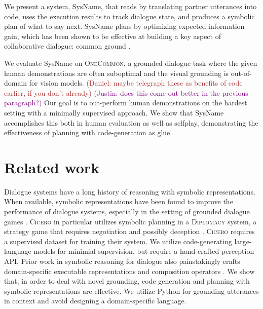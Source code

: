 \documentclass[11pt]{article}
\newcommand{\system}{SysName}
\newcommand{\justin}[1]{{{\textcolor{purple}{(Justin: #1)}}}}
\newcommand{\daniel}[1]{{{\textcolor{brown}{(Daniel: #1)}}}}
\begin{document}
We present a system, \system{}, 
that reads by translating partner utterances into code,
uses the execution results to track dialogue state, and produces a symbolic plan of what to say next.
\system{} plans by optimizing expected information gain, which has been shown to be effective at building 
a key aspect of collaborative dialogue: common ground \citep{yu2019info,white-etal-2021-open,ocp}.

We evaluate \system{} on \textsc{OneCommon},
a grounded dialogue task where the given human demonstrations are often suboptimal and the visual grounding
is out-of-domain for vision models.
\daniel{maybe telegraph these as benefits of code earlier, if you don't already}
\justin{does this come out better in the previous paragraph?}
Our goal is to out-perform human demonstrations on the hardest setting
with a minimally supervised approach.
We show that \system{} accomplishes this both in human evaluation as well as selfplay,
demonstrating the effectiveness of planning with code-generation as glue.

\section{Related work}
Dialogue systems have a long history of reasoning with symbolic representations.
When available, symbolic representations have been found to improve
the performance of dialogue systems, especially in the setting of grounded dialogue games \citep{winograd,young2006pomdp,he2018dnd,cicero}.
\textsc{Cicero} in particular utilizes symbolic planning in a \textsc{Diplomacy} system,
a strategy game that requires negotiation and possibly deception \citep{cicero}.
\textsc{Cicero} requires a supervised dataset for training their system.
We utilize code-generating large-language models for minimial supervision, but require a hand-crafted perception API.
Prior work in symbolic reasoning for dialogue also painstakingly crafts domain-specific executable representations  and composition operators \citep{sm}.
We show that, in order to deal with novel grounding, code generation and planning with symbolic representations
are effective.
We utilize Python for grounding utterances in context and avoid designing a domain-specific language.
\end{document}

